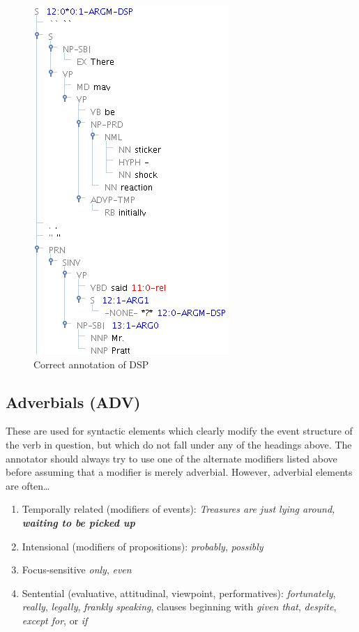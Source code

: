 \documentclass[11pt]{report}
\begin{document}
\begin{figure}[htbp]
\centering
\includegraphics[scale=0.35]{img/DSPPic.png}
\caption{Correct annotation of DSP}
\label{fig: dsp}
\end{figure}

\subsection{Adverbials (ADV)}
\label{ssec: ADV}

These are used for syntactic elements which clearly modify the event structure of the verb in question, but which do not fall under any of the headings above.  The annotator should always try to use one of the alternate modifiers listed above before assuming that a modifier is merely adverbial.  However, adverbial elements are often\ldots 
\begin{enumerate}
\item Temporally related (modifiers of events): \textit{Treasures are just lying around, \textbf{waiting to be picked up}} 
\item Intensional (modifiers of propositions): \textit{probably}, \textit{possibly} 
\item Focus-sensitive \textit{only}, \textit{even} 
\item Sentential (evaluative, attitudinal, viewpoint, performatives): \textit{fortunately}, \textit{really}, \textit{legally}, \textit{frankly speaking}, clauses beginning with \textit{given that}, \textit{despite}, \textit{except for}, or \textit{if}
\end{enumerate}
\end{document}
